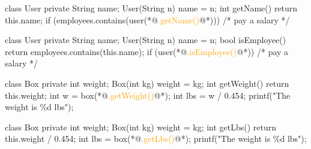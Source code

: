 \documentclass{article}
\begin{document}
\begin{lnSnippet}
class User {
  private String name;
  User(String n) { name = n; }
  int getName() {
    return this.name;
  }
}
if (employees.contains(user(*@\textcolor{orange}{.getName()}@*))) {
  /* pay a salary */
}
\end{lnSnippet}
\begin{lnSnippet}
class User {
  private String name;
  User(String n) { name = n; }
  bool isEmployee() {
    return employees.contains(this.name);
  }
}
if (user(*@\textcolor{orange}{.isEmployee()}@*)) {
  /* pay a salary */
}
\end{lnSnippet}

\begin{lnSnippet}
class Box {
  private int weight;
  Box(int kg) { weight = kg; }
  int getWeight() {
    return this.weight;
  }
}
int w = box(*@\textcolor{orange}{.getWeight()}@*);
int lbs = w / 0.454;
printf("The weight is \%d lbs\n");
\end{lnSnippet}
\begin{lnSnippet}
class Box {
  private int weight;
  Box(int kg) { weight = kg; }
  int getLbs() {
    return this.weight / 0.454;
  }
}
int lbs = box(*@\textcolor{orange}{.getLbs()}@*);
printf("The weight is \%d lbs\n");
\end{lnSnippet}

\end{document}
